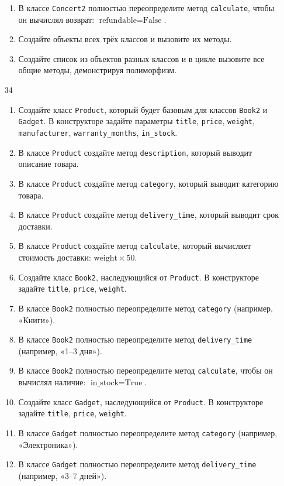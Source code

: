 \begin{enumerate}
\begin{enumerate}
    \item В классе \texttt{Concert2} полностью переопределите метод \texttt{calculate}, чтобы он вычислял возврат: \( \text{refundable} = \text{False} \).
    \item Создайте объекты всех трёх классов и вызовите их методы.
    \item Создайте список из объектов разных классов и в цикле вызовите все общие методы, демонстрируя полиморфизм.
\end{enumerate}
\item[34]
\begin{enumerate}
    \item Создайте класс \texttt{Product}, который будет базовым для классов \texttt{Book2} и \texttt{Gadget}. В конструкторе задайте параметры \texttt{title}, \texttt{price}, \texttt{weight}, \texttt{manufacturer}, \texttt{warranty\_months}, \texttt{in\_stock}.
    \item В классе \texttt{Product} создайте метод \texttt{description}, который выводит описание товара.
    \item В классе \texttt{Product} создайте метод \texttt{category}, который выводит категорию товара.
    \item В классе \texttt{Product} создайте метод \texttt{delivery\_time}, который выводит срок доставки.
    \item В классе \texttt{Product} создайте метод \texttt{calculate}, который вычисляет стоимость доставки: \( \text{weight} \times 50 \).
    \item Создайте класс \texttt{Book2}, наследующийся от \texttt{Product}. В конструкторе задайте \texttt{title}, \texttt{price}, \texttt{weight}.
    \item В классе \texttt{Book2} полностью переопределите метод \texttt{category} (например, «Книги»).
    \item В классе \texttt{Book2} полностью переопределите метод \texttt{delivery\_time} (например, «1–3 дня»).
    \item В классе \texttt{Book2} полностью переопределите метод \texttt{calculate}, чтобы он вычислял наличие: \( \text{in\_stock} = \text{True} \).
    \item Создайте класс \texttt{Gadget}, наследующийся от \texttt{Product}. В конструкторе задайте \texttt{title}, \texttt{price}, \texttt{weight}.
    \item В классе \texttt{Gadget} полностью переопределите метод \texttt{category} (например, «Электроника»).
    \item В классе \texttt{Gadget} полностью переопределите метод \texttt{delivery\_time} (например, «3–7 дней»).

\end{enumerate}
\end{enumerate}
